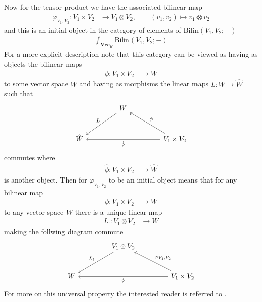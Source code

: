 Now for the tensor product we have the associated bilinear map
\begin{align*}
  \varphi_{V_{1},V_{2}}
  \colon
  V_{1}
  \times
  V_{2}
  &\to
  V_{1}
  \otimes
  V_{2}
  ,\qquad
  (v_{1},v_{2})
  \mapsto
  v_{1}
  \otimes
  v_{2}
\end{align*}
and this is an initial object in the category of elements of $\mathrm{Bilin}(V_{1},V_{2};-)$
\begin{align*}
  \int_{\mathbf{Vec}_{K}}
  \mathrm{Bilin}(V_{1},V_{2};-)
\end{align*}
For a more explicit description note that this category can be viewed as having as objects the bilinear maps
\begin{align*}
  \phi
  \colon
  V_{1}
  \times
  V_{2}
  &\to
  W
\end{align*}
to some vector space $W$ and having as morphisms the linear maps $L \colon W \to \hat{W}$ such that
\begin{equation*}
\begin{tikzcd}[row sep=large,column sep=4.3em]
  &
  W
  \ar{ld}[swap]{L}
  &
  \\
  \hat{W}
  &
  &
  V_{1} \times V_{2}
  \ar{lu}[swap]{\phi}
  \ar{ll}{\hat{\phi}}
\end{tikzcd}
\end{equation*}
commutes where
\begin{align*}
  \hat{\phi}
  \colon
  V_{1}
  \times
  V_{2}
  &\to
  \hat{W}
\end{align*}
is another object. Then for $\varphi_{V_{1},V_{2}}$ to be an initial object means that for any bilinear map
\begin{align*}
  \phi
  \colon
  V_{1}
  \times
  V_{2}
  &\to
  W
\end{align*}
to any vector space $W$ there is a unique linear map
\begin{align*}
  L_{!}
  \colon
  V_{1}
  \otimes
  V_{2}
  &\to
  W
\end{align*}
making the follwing diagram commute
\begin{equation*}
\begin{tikzcd}[row sep=large,column sep=4.3em]
  &
  V_{1} \otimes V_{2}
  \ar{ld}[swap]{L_{!}}
  &
  \\
  W
  &
  &
  V_{1} \times V_{2}
  \ar{lu}[swap]{\varphi_{V_{1},V_{2}}}
  \ar{ll}{\phi}
\end{tikzcd}
\end{equation*}
For more on this universal property the interested reader is referred to \cite{52fbba46}.
